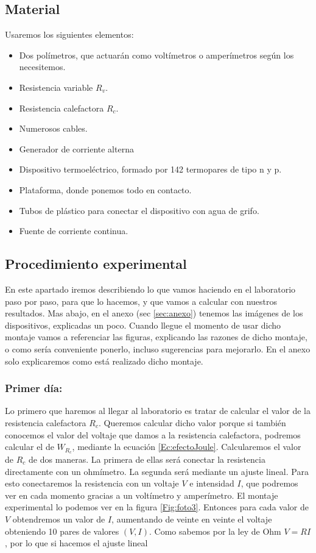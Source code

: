 \documentclass[12pt,a4paper]{article}
\begin{document}
\subsection{Material}

Usaremos los siguientes elementos:

\begin{itemize}
\item Dos polímetros, que actuarán como voltímetros o amperímetros según los necesitemos.
\item Resistencia variable $R_v$.
\item Resistencia calefactora $R_c$.
\item Numerosos cables.
\item Generador de corriente alterna
\item Dispositivo termoeléctrico, formado por 142 termopares de tipo n y p. 
\item Plataforma, donde ponemos todo en contacto.
\item Tubos de plástico para conectar el dispositivo con agua de grifo.
\item Fuente de corriente continua.
\end{itemize}

\subsection{Procedimiento experimental}



En este apartado iremos describiendo lo que vamos haciendo en el laboratorio paso por paso, para que lo hacemos, y que vamos a calcular con nuestros resultados. Mas abajo, en el anexo (sec \ref{sec:anexo}) tenemos las imágenes de los dispositivos, explicadas un poco. Cuando llegue el momento de usar dicho montaje vamos a referenciar las figuras, explicando las razones de dicho montaje, o como sería conveniente ponerlo, incluso sugerencias para mejorarlo. En el anexo solo explicaremos como está realizado dicho montaje.


\subsubsection{Primer día:}

Lo primero que haremos al llegar al laboratorio es tratar de calcular el valor de la resistencia calefactora $R_c$. Queremos calcular dicho valor porque si también conocemos el valor del voltaje que damos a la resistencia calefactora, podremos calcular el de $W_{R_c}$, mediante la ecuación \ref{Ec:efectoJoule}. Calcularemos el valor de $R_c$ de dos maneras. La primera de ellas será conectar la resistencia directamente con un ohmímetro. La segunda será mediante un ajuste lineal. Para esto conectaremos la resistencia con un voltaje $V$ e intensidad $I$, que podremos ver en cada momento gracias a un voltímetro y amperímetro. El montaje experimental lo podemos ver en la figura \ref{Fig:foto3}. Entonces para cada valor de $V$ obtendremos un valor de $I$, aumentando de veinte en veinte el voltaje obteniendo 10 pares de valores $(V,I)$. Como sabemos por la ley de Ohm $V = RI$, por lo que si hacemos el ajuste lineal
\end{document}
